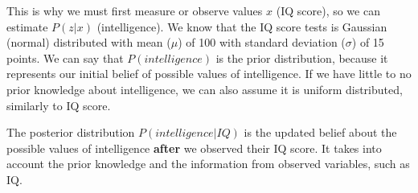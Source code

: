 \begin{center}
\end{center}

This is why we must first measure or observe values $x$ (IQ score), so we can estimate $P(z|x)$ (intelligence). We know that the IQ score tests is Gaussian (normal) distributed with mean ($\mu$) of 100 with standard deviation ($\sigma$) of 15 points. We can say that $P(intelligence)$ is the prior distribution, because it represents our initial belief of possible values of intelligence. If we have little to no prior knowledge about intelligence, we can also assume it is uniform distributed, similarly to IQ score.

The posterior distribution $P(intelligence|IQ)$ is the updated belief about the possible values of intelligence \textbf{after} we observed their IQ score. It takes into account the prior knowledge and the information from observed variables, such as IQ.

